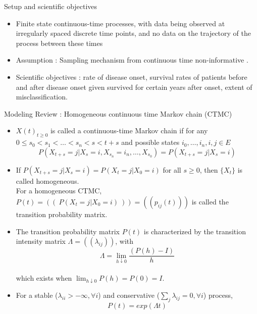 \documentclass{beamer}
\begin{document}
\begin{frame}{Setup and scientific objectives}
\begin{itemize}
\item Finite state continuous-time processes, with data being observed at irregularly spaced discrete time points, and no data on the trajectory of the process between these times
\vspace{4mm}
\item Assumption : Sampling mechanism from continuous time non-informative \citep{gruger1991validity}.
\vspace{4mm}
\item Scientific objectives : rate of disease onset, survival rates of patients before and after disease onset given survived for certain years after onset, extent of misclassification.
\end{itemize}
\end{frame}
\begin{frame}{Modeling Review : Homogeneous continuous time Markov chain (CTMC)}
\begin{itemize}
\item $X(t)_{t\geq 0}$ is called a continuous-time Markov chain if for any $0\leq s_0 < s_1 < \ldots <s_n < s <t+s$ and possible states $i_0,\ldots, i_n,i,j \in E$
\[
P(X_{t+s}=j|X_s =i,X_{s_n}=i_n,\ldots,X_{s_0})=P(X_{t+s}=j|X_s=i)
\]
\vspace{4mm}
\item If $P(X_{t+s}=j|X_s = i)=P(X_t = j | X_0 =i)$ for all $s\geq 0$, then $\{X_t\}$ is called homogeneous. \vspace{2mm}\\ For a homogeneous CTMC, $P(t)=\left(\left(~P(X_t = j | X_0 =i)~\right)\right)=((p_{ij}(t)))$ is called the transition probability matrix.
\end{itemize}
\end{frame}
\begin{frame}
\begin{itemize}
\item  The transition probability matrix $P(t)$ is characterized by the transition intensity matrix $\Lambda=((\lambda_{ij}))$, with \[\Lambda=\lim_{h\downarrow 0} \frac{(P(h)-I)}{h}\]\\ \vspace{5mm}
which exists when $\lim_{h \downarrow 0} P(h)=P(0)=I$. 
\vspace{8mm}
\item For a stable ($\lambda_{ii} > - \infty,\forall i$) and conservative ($\sum_{j} \lambda_{ij} =0, \forall i$) process, \[P(t) = exp(\Lambda t)\]
\end{itemize}
\end{frame}
\end{document}
